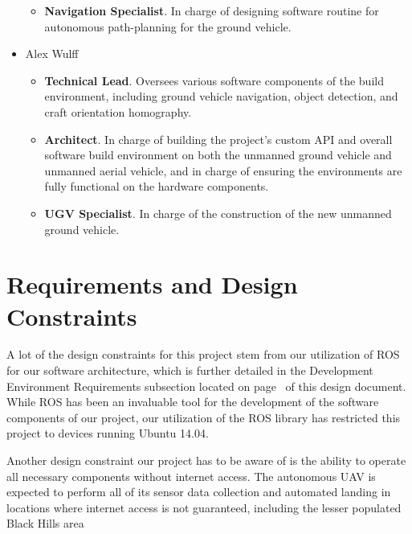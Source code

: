 \begin{itemize}
		\begin{itemize}
			\item \textbf{Navigation Specialist}. In charge of designing software routine for autonomous path-planning for the ground vehicle.
		\end{itemize}
	\item[] Alex Wulff
		\begin{itemize}
			\item \textbf{Technical Lead}. Oversees various software components of the build environment, including ground vehicle navigation, object detection, and craft orientation homography.
			\item \textbf{Architect}. In charge of building the project's custom API and overall software build environment on both the unmanned ground vehicle and unmanned aerial vehicle, and in charge of ensuring the environments are fully functional on the hardware components.
			\item \textbf{UGV Specialist}. In charge of the construction of the new unmanned ground vehicle.
		\end{itemize}
\end{itemize}



\section{Requirements and Design Constraints}
A lot of the design constraints for this project stem from our utilization of ROS for our software architecture, which is further detailed in the Development Environment Requirements subsection located on page~\pageref{subsectionDevelopmentEnvironmentRequirements} of this design document. While ROS has been an invaluable tool for the development of the software components of our project, our utilization of the ROS library has restricted this project to devices running Ubuntu 14.04.

Another design constraint our project has to be aware of is the ability to operate all necessary components without internet access. The autonomous UAV is expected to perform all of its sensor data collection and automated landing in locations where internet access is not guaranteed, including the lesser populated Black Hills area

